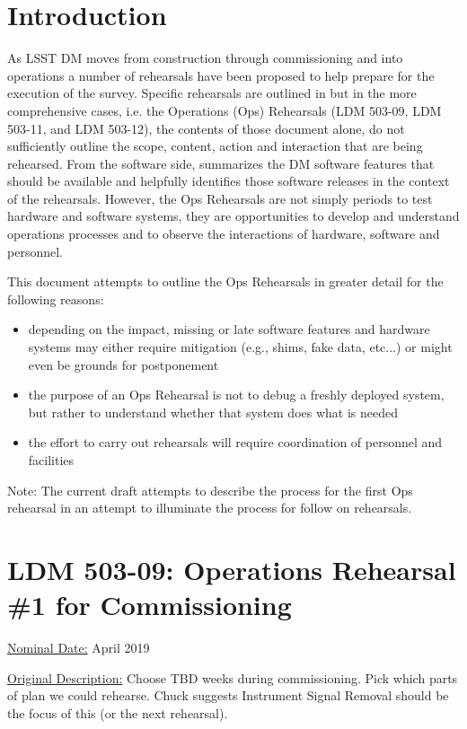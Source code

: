 
\section{Introduction}

As LSST DM moves from construction through commissioning and into operations 
a number of rehearsals have been proposed to help prepare for the execution 
of the survey.  Specific rehearsals are outlined in  but in 
the more comprehensive cases, i.e. the Operations (Ops) Rehearsals (LDM 503-09, LDM 503-11, and 
LDM 503-12), the contents of those document alone, do not sufficiently outline 
the scope, content, action and interaction that are being rehearsed.  
From the software side, 
summarizes the DM software features that should be available and helpfully 
identifies those software releases in the context of the rehearsals.  
However, the Ops Rehearsals are not simply periods to test hardware and 
software systems, they are opportunities to develop and understand operations 
processes and to observe the interactions of hardware, software and personnel.

This document attempts to outline the Ops Rehearsals in greater detail for the following reasons:
\begin{itemize}
\item depending on the impact, missing or late software features and hardware systems may either
require mitigation (e.g., shims, fake data, etc...) or might even be grounds for 
postponement
\item the purpose of an Ops Rehearsal is not to debug 
a freshly deployed system, but rather to understand whether that system does
what is needed
\item the effort to carry out rehearsals will 
require coordination of personnel and facilities
\end{itemize}

Note: The current draft attempts to describe the process for the first Ops 
rehearsal in an attempt to illuminate the process for follow on rehearsals.


\section{LDM 503-09: Operations Rehearsal \#1 for Commissioning}

\underline{Nominal Date:} April 2019

\underline{Original Description:}
Choose TBD weeks during commissioning. Pick which parts of plan we could 
rehearse.  Chuck suggests Instrument Signal Removal should be the focus 
of this (or the next rehearsal).

